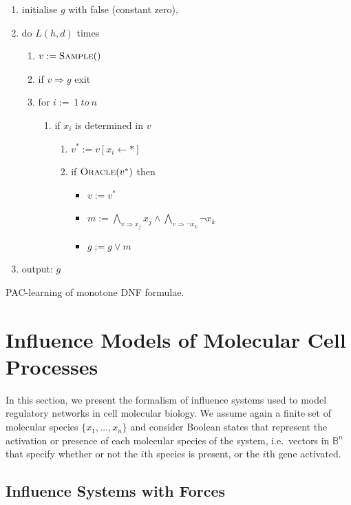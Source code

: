 \documentclass{llncs}
\begin{document}
\begin{algorithm}
\begin{enumerate}
\item initialise $g$ with false (constant zero),
\item
do $L(h,d)$ times 
\begin{enumerate}
\item $v:=\textsc{Sample}()$
	\item 
	if $v\Rightarrow g$ exit
\item for $i:=\ 1\ to \ n$
\begin{enumerate}
\item if $x_i$ is determined in $v$
\begin{enumerate}
\item $v^*:=v[x_i\leftarrow *]$
\item if $\textsc{Oracle}(v^*)$ then 
\begin{itemize}
\item $v:=v^*$
\item $m:=\bigwedge_{v\Rightarrow x_j} x_j\wedge\bigwedge_{v\Rightarrow\neg x_k}\neg x_k$ 
\item $g:=g\vee m$
\end{itemize}
\end{enumerate}
\end{enumerate}
\end{enumerate}
\item output: $g$
\end{enumerate}
\caption{PAC-learning of monotone DNF formulae.\label{algDNF}}
\end{algorithm}





\section{Influence Models of Molecular Cell Processes}

In this section, we present the formalism of influence systems used to model regulatory networks in cell molecular biology.
We assume again a finite set of molecular species $\{x_1,\dots,x_n\}$ 
and consider Boolean states that represent the activation or presence of each molecular species of the system, 
i.e.~vectors in $\mathbb{B}^n$ that specify whether or not the $i$th species is present, or the $i$th gene activated.

\subsection{Influence Systems with Forces}
\end{document}
